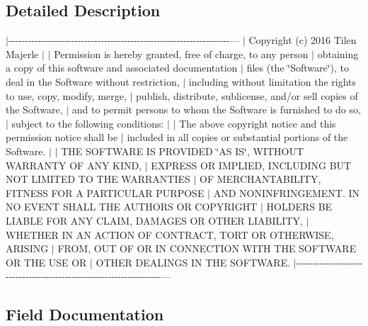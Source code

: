\subsection{Detailed Description}
$\vert$-\/-\/-\/-\/-\/-\/-\/-\/-\/-\/-\/-\/-\/-\/-\/-\/-\/-\/-\/-\/-\/-\/-\/-\/-\/-\/-\/-\/-\/-\/-\/-\/-\/-\/-\/-\/-\/-\/-\/-\/-\/-\/-\/-\/-\/-\/-\/-\/-\/-\/-\/-\/-\/-\/-\/-\/-\/-\/-\/-\/-\/-\/-\/-\/-\/-\/-\/--- $\vert$ Copyright (c) 2016 Tilen Majerle $\vert$ $\vert$ Permission is hereby granted, free of charge, to any person $\vert$ obtaining a copy of this software and associated documentation $\vert$ files (the \char`\"{}\+Software\char`\"{}), to deal in the Software without restriction, $\vert$ including without limitation the rights to use, copy, modify, merge, $\vert$ publish, distribute, sublicense, and/or sell copies of the Software, $\vert$ and to permit persons to whom the Software is furnished to do so, $\vert$ subject to the following conditions\+: $\vert$ $\vert$ The above copyright notice and this permission notice shall be $\vert$ included in all copies or substantial portions of the Software. $\vert$ $\vert$ T\+HE S\+O\+F\+T\+W\+A\+RE IS P\+R\+O\+V\+I\+D\+ED \char`\"{}\+A\+S I\+S\char`\"{}, W\+I\+T\+H\+O\+UT W\+A\+R\+R\+A\+N\+TY OF A\+NY K\+I\+ND, $\vert$ E\+X\+P\+R\+E\+SS OR I\+M\+P\+L\+I\+ED, I\+N\+C\+L\+U\+D\+I\+NG B\+UT N\+OT L\+I\+M\+I\+T\+ED TO T\+HE W\+A\+R\+R\+A\+N\+T\+I\+ES $\vert$ OF M\+E\+R\+C\+H\+A\+N\+T\+A\+B\+I\+L\+I\+TY, F\+I\+T\+N\+E\+SS F\+OR A P\+A\+R\+T\+I\+C\+U\+L\+AR P\+U\+R\+P\+O\+SE $\vert$ A\+ND N\+O\+N\+I\+N\+F\+R\+I\+N\+G\+E\+M\+E\+NT. IN NO E\+V\+E\+NT S\+H\+A\+LL T\+HE A\+U\+T\+H\+O\+RS OR C\+O\+P\+Y\+R\+I\+G\+HT $\vert$ H\+O\+L\+D\+E\+RS BE L\+I\+A\+B\+LE F\+OR A\+NY C\+L\+A\+IM, D\+A\+M\+A\+G\+ES OR O\+T\+H\+ER L\+I\+A\+B\+I\+L\+I\+TY, $\vert$ W\+H\+E\+T\+H\+ER IN AN A\+C\+T\+I\+ON OF C\+O\+N\+T\+R\+A\+CT, T\+O\+RT OR O\+T\+H\+E\+R\+W\+I\+SE, A\+R\+I\+S\+I\+NG $\vert$ F\+R\+OM, O\+UT OF OR IN C\+O\+N\+N\+E\+C\+T\+I\+ON W\+I\+TH T\+HE S\+O\+F\+T\+W\+A\+RE OR T\+HE U\+SE OR $\vert$ O\+T\+H\+ER D\+E\+A\+L\+I\+N\+GS IN T\+HE S\+O\+F\+T\+W\+A\+RE. $\vert$-\/-\/-\/-\/-\/-\/-\/-\/-\/-\/-\/-\/-\/-\/-\/-\/-\/-\/-\/-\/-\/-\/-\/-\/-\/-\/-\/-\/-\/-\/-\/-\/-\/-\/-\/-\/-\/-\/-\/-\/-\/-\/-\/-\/-\/-\/-\/-\/-\/-\/-\/-\/-\/-\/-\/-\/-\/-\/-\/-\/-\/-\/-\/-\/-\/-\/-\/--- 

\subsection{Field Documentation}
\mbox{\label{struct_h_d44780___options__t_a28905366e0f6914c460923c66bafedcb}} 
